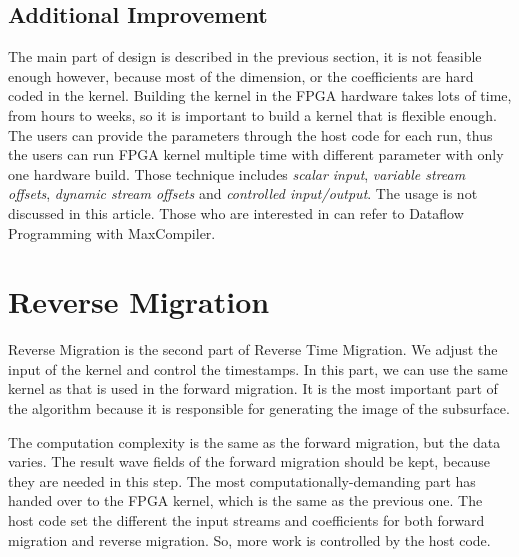 \subsection{Additional Improvement} %
The main part of design is described in the previous section, it is not
feasible enough however, because most of the dimension, or the coefficients
are hard coded in the kernel. Building the kernel in the FPGA hardware
takes lots of time, from hours to weeks, so it is important to build a
kernel that is flexible enough. The users can provide the parameters
through the host code for each run, thus the users can run FPGA kernel
multiple time with different parameter with only one hardware build. Those
technique includes \emph{scalar input}, \emph{variable stream offsets},
\emph{dynamic stream offsets} and \emph{controlled input/output}. The usage
is not discussed in this article. Those who are interested in can refer to
Dataflow Programming with MaxCompiler\cite{maxcompiler_tutorial}.

\label{ssub:Additional improvement}



\section{Reverse Migration} %

Reverse Migration is the second part of Reverse Time Migration. We adjust
the input of the kernel and control the timestamps. In this part, we can
use the same kernel as that is used in the forward migration. It is the
most important part of the algorithm because it is responsible for
generating the image of the subsurface.

The computation complexity is the same as the forward migration, but the
data varies. The result wave fields of the forward migration should be
kept, because they are needed in this step. The most
computationally-demanding part has handed over to the FPGA kernel, which is
the same as the previous one. The host code set the different the input
streams and coefficients for both forward migration and reverse migration.
So, more work is controlled by the host code.

\label{sub:Reverse Mi}

